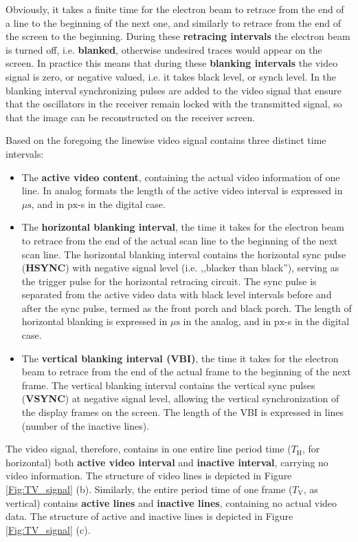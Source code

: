 Obviously, it takes a finite time for the electron beam to retrace from the end of a line to the beginning of the next one, and similarly to retrace from the end of the screen to the beginning.
During these \textbf{retracing intervals} the electron beam is turned off, i.e. \textbf{blanked}, otherwise undesired traces would appear on the screen.
In practice this means that during these \textbf{blanking intervals} the video signal is zero, or negative valued, i.e. it takes black level, or synch level.
In the blanking interval synchronizing pulses are added to the video signal that ensure that the oscillators in the receiver remain locked with the transmitted signal, so that the image can be reconstructed on the receiver screen.

Based on the foregoing the linewise video signal contains three distinct time intervals:
\begin{itemize}
\item The \textbf{active video content}, containing the actual video information of one line.
In analog formats the length of the active video interval is expressed in $\mu \mathrm{s}$, and in $\mathrm{px}$-s in the digital case.
\item The \textbf{horizontal blanking interval}, the time it takes for the electron beam to retrace from the end of the actual scan line to the beginning of the next scan line.
The horizontal blanking interval contains the horizontal sync pulse (\textbf{HSYNC}) with negative signal level (i.e. ,,blacker than black''), serving as the trigger pulse for the horizontal retracing circuit.
The sync pulse is separated from the active video data with black level intervals before and after the sync pulse, termed as the front porch and black porch.
The length of horizontal blanking is expressed in $\mu \mathrm{s}$ in the analog, and in $\mathrm{px}$-s in the digital case.
\item The \textbf{vertical blanking interval (VBI)}, the time it takes for the electron beam to retrace from the end of the actual frame to the beginning of the next frame.
The vertical blanking interval contains the vertical sync pulses (\textbf{VSYNC}) at negative signal level, allowing the vertical synchronization of the display frames on the screen.
The length of the VBI is expressed in lines (number of the inactive lines).
\end{itemize}
The video signal, therefore, contains in one entire line period time ($T_{\mathrm{H}}$, for horizontal) both \textbf{active video interval} and \textbf{inactive interval}, carrying no video information.
The structure of video lines is depicted in Figure \ref{Fig:TV_signal} (b).
Similarly, the entire period time of one frame ($T_{\mathrm{V}}$, as vertical) contains \textbf{active lines} and \textbf{inactive lines}, containing no actual video data.
The structure of active and inactive lines is depicted in Figure \ref{Fig:TV_signal} (c).

